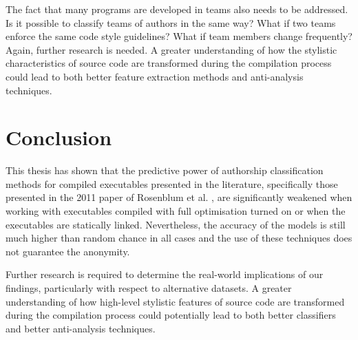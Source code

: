 \documentclass[a4paper,11pt]{kth-mag}
\begin{document}
The fact that many programs are developed in teams also needs to be addressed.
Is it possible to classify teams of authors in the same way? What if two teams
enforce the same code style guidelines? What if team members change frequently? 
Again, further research is needed. A greater understanding of how the stylistic
characteristics of source code are transformed during the compilation process
could lead to both better feature extraction methods and anti-analysis
techniques.

\chapter{Conclusion}
This thesis has shown that the predictive power of authorship classification
methods for compiled executables presented in the literature, specifically
those presented in the 2011 paper of Rosenblum et al.
\parencite{rosenblum2011wrote}, are significantly weakened when working with
executables compiled with full optimisation turned on or when the executables
are statically linked. Nevertheless, the accuracy of the models is still much
higher than random chance in all cases and the use of these techniques does not
guarantee the anonymity.

Further research is required to determine the real-world implications of our
findings, particularly with respect to alternative datasets. A greater
understanding of how high-level stylistic features of source code are
transformed during the compilation process could potentially lead to both
better classifiers and better anti-analysis techniques.

\printbibliography
\end{document}
